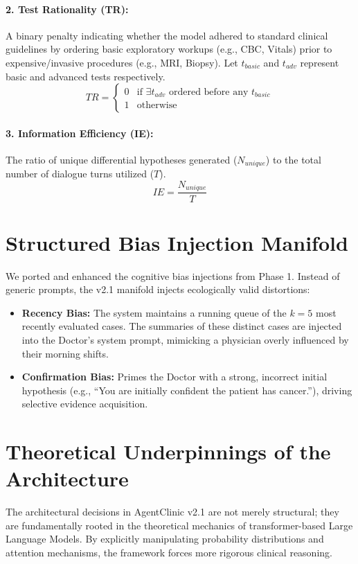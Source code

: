 \documentclass[12pt, a4paper, twoside]{report}
\begin{document}
\paragraph{2. Test Rationality (TR):} A binary penalty indicating whether the model adhered to standard clinical guidelines by ordering basic exploratory workups (e.g., CBC, Vitals) prior to expensive/invasive procedures (e.g., MRI, Biopsy). Let $t_{basic}$ and $t_{adv}$ represent basic and advanced tests respectively.
\begin{equation}
TR = \begin{cases} 
0 & \text{if } \exists t_{adv} \text{ ordered before any } t_{basic} \\
1 & \text{otherwise} 
\end{cases}
\end{equation}

\paragraph{3. Information Efficiency (IE):} The ratio of unique differential hypotheses generated ($N_{unique}$) to the total number of dialogue turns utilized ($T$).
\begin{equation}
IE = \frac{N_{unique}}{T}
\end{equation}

\section{Structured Bias Injection Manifold}
We ported and enhanced the cognitive bias injections from Phase 1. Instead of generic prompts, the v2.1 manifold injects ecologically valid distortions:
\begin{itemize}
    \item \textbf{Recency Bias:} The system maintains a running queue of the $k=5$ most recently evaluated cases. The summaries of these distinct cases are injected into the Doctor's system prompt, mimicking a physician overly influenced by their morning shifts.
    \item \textbf{Confirmation Bias:} Primes the Doctor with a strong, incorrect initial hypothesis (e.g., ``You are initially confident the patient has cancer.''), driving selective evidence acquisition.
\end{itemize}

\section{Theoretical Underpinnings of the Architecture}
The architectural decisions in AgentClinic v2.1 are not merely structural; they are fundamentally rooted in the theoretical mechanics of transformer-based Large Language Models. By explicitly manipulating probability distributions and attention mechanisms, the framework forces more rigorous clinical reasoning.
\end{document}
